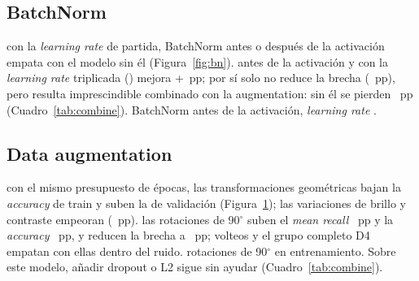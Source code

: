 \subsection{BatchNorm}
{con la \emph{learning rate} de partida, BatchNorm antes o después de la activación empata con el modelo sin él
(Figura~\ref{fig:bn}).}
{antes de la activación y con la \emph{learning rate} triplicada () mejora +~pp; por sí
solo no reduce la brecha (~pp), pero resulta imprescindible combinado con la augmentation: sin
él se pierden ~pp (Cuadro~\ref{tab:combine}).}
{BatchNorm antes de la activación, \emph{learning rate} .}

\subsection{Data augmentation}
{con el mismo presupuesto de épocas, las transformaciones geométricas bajan la \emph{accuracy} de train y suben la de
validación (Figura~\ref{fig:aug}); las variaciones de brillo y contraste empeoran
(~pp).}
{las rotaciones de 90$^\circ$ suben el \emph{mean recall} ~pp y la \emph{accuracy}
~pp, y reducen la brecha a ~pp; volteos y el grupo completo D4 empatan con
ellas dentro del ruido.}
{rotaciones de 90$^\circ$ en entrenamiento. Sobre este modelo, añadir dropout o L2 sigue sin ayudar
(Cuadro~\ref{tab:combine}).}

\begin{figure}[!htbp]
  \centering
  \begin{minipage}[t]{0.485\linewidth}
    \centering
    \caption{}
    \label{fig:bn}
  \end{minipage}\hfill
  \begin{minipage}[t]{0.485\linewidth}
    \centering
    \caption{}
    \label{fig:aug}
  \end{minipage}
\end{figure}

\begin{table}[h]
  \centering\small
  \caption{Cambios sobre el modelo con BatchNorm y rotaciones ( semillas por fila).}
  \label{tab:combine}
\end{table}
